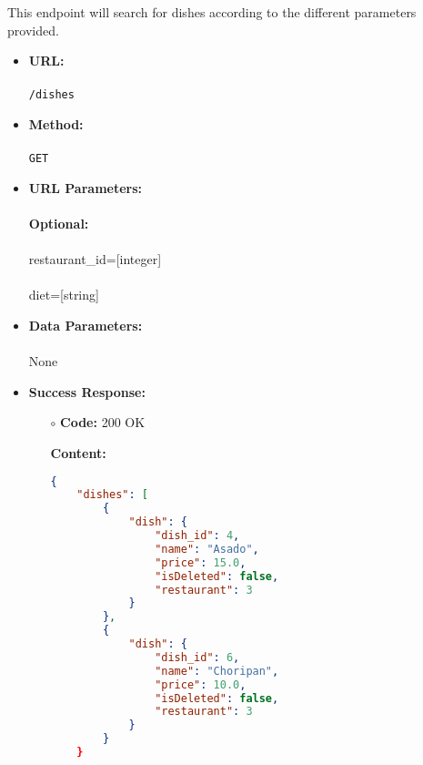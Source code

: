 

This endpoint will search for dishes according to the different parameters provided.

\begin{itemize}
	\item \textbf{URL:} \\\\\texttt{/dishes}
	\item \textbf{Method:} \\\\\texttt{GET}
	\item \textbf{URL Parameters:}\\\\
	\textbf{Optional:}\\\\
	restaurant\_id=[integer]\\\\
	diet=[string]
	\item \textbf{Data Parameters:} \\\\None
	\item \textbf{Success Response:}
	\begin{itemize}
		\item[$\circ$] \textbf{Code:} 200 OK
		\item[] \textbf{Content:}
		\begin{lstlisting}[language=json]
		{
    "dishes": [
        {
            "dish": {
                "dish_id": 4,
                "name": "Asado",
                "price": 15.0,
                "isDeleted": false,
                "restaurant": 3
            }
        },
        {
            "dish": {
                "dish_id": 6,
                "name": "Choripan",
                "price": 10.0,
                "isDeleted": false,
                "restaurant": 3
            }
        }		
	}
		\end{lstlisting}
	\end{itemize}
	

\end{itemize}
